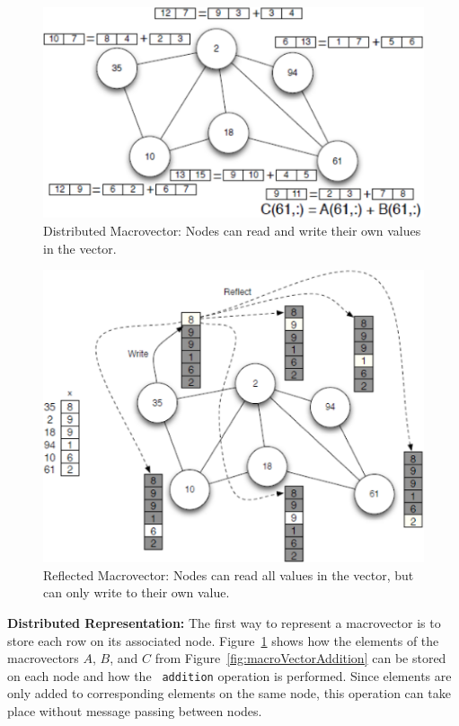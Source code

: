 \begin{figure}[h]
  \centering
  \includegraphics[width=0.8\columnwidth]{fig/DistributedArray.eps}
  \caption[Distributed Macrovector]{Distributed Macrovector: Nodes can read and write their own values in
  the vector.}
  \label{fig:distributedVector}
\end{figure}

\begin{figure}
  \centering
  \includegraphics[width=0.8\columnwidth]{fig/ReflectedArray.eps}
  \caption[Reflected Macrovector]{Reflected Macrovector: Nodes can read all values in the vector, but can only write to their own value.}
  \label{fig:reflectedVector}
\end{figure}

{\bf Distributed Representation:} The first way to represent a macrovector is to
store each row on its associated node.  Figure~\ref{fig:distributedVector} shows
how the elements of the macrovectors $A$, $B$, and $C$ from
Figure~\ref{fig:macroVectorAddition} can be stored on each node and how the {\tt
addition} operation is performed. Since elements are only added to corresponding
elements on the same node, this operation can take place without message passing
between nodes.


